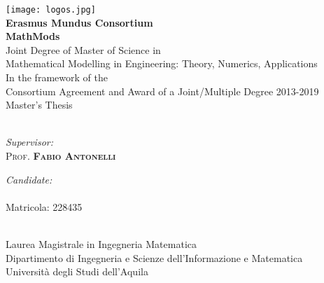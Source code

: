 

\begin{titlepage}
	\begin{center}

		\texttt{[image: logos.jpg]} \\[2em]

		{\Large\bfseries Erasmus Mundus Consortium} \\[1em]
		{\LARGE\bfseries MathMods} \\[2em]
		
		{\large Joint Degree of Master of Science in} \\
		{\large Mathematical Modelling in Engineering: Theory, Numerics, Applications} \\[1em]
		
		{\large In the framework of the} \\
		{\large Consortium Agreement and Award of a Joint/Multiple Degree 2013-2019} \\[3em]
		
		{\LARGE Master's Thesis} \\[1.5em]
		{\Huge\bfseries \thetitle}
		\\[3em]

		\begin{minipage}[t]{0.5\textwidth}
			\begin{center} \Large
				\emph{Supervisor:} \\
				\textsc{\LARGE Prof. \textbf{Fabio Antonelli}}
			\end{center}
		\end{minipage}
		\begin{minipage}[t]{0.4\textwidth}
			\begin{center} \Large
				\emph{Candidate:}\\
				{\LARGE\textbf{\textsc{\theauthor}}}\\
				Matricola: 228435
			\end{center}
		\end{minipage}
		
		\vfill

		{\large \thedate} \\[2em]
		
		{\color{Tan}
			Laurea Magistrale in Ingegneria Matematica\\
			Dipartimento di Ingegneria e Scienze dell'Informazione e Matematica\\
			Università degli Studi dell'Aquila
			}

	\end{center}
\end{titlepage}


